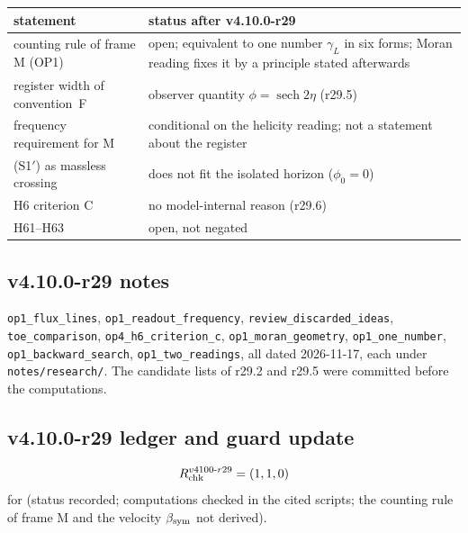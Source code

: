 \begin{center}
\small
\begin{tabular}{@{}>{\raggedright\arraybackslash}p{}>{\raggedright\arraybackslash}p{}@{}}
\toprule
statement & status after v4.10.0-r29\\
\midrule
counting rule of frame M (OP1) & open; equivalent to one number \(\gamma_L\) in six forms; Moran reading fixes it by a principle stated afterwards\\
register width of convention~F & observer quantity \(\phi=\operatorname{sech}2\eta\) (r29.5)\\
frequency requirement for M & conditional on the helicity reading; not a statement about the register\\
(S1\('\)) as massless crossing & does not fit the isolated horizon (\(\phi_0=0\))\\
H6 criterion C & no model-internal reason (r29.6)\\
H61--H63 & open, not negated\\
\bottomrule
\end{tabular}
\end{center}

\subsection*{v4.10.0-r29 notes}
\label{subsec:v4100-r29-notes}

\texttt{op1\_\allowbreak flux\_\allowbreak lines}, \texttt{op1\_\allowbreak readout\_\allowbreak frequency}, \texttt{review\_\allowbreak discarded\_\allowbreak ideas},
\texttt{toe\_\allowbreak comparison}, \texttt{op4\_\allowbreak h6\_\allowbreak criterion\_\allowbreak c}, \texttt{op1\_\allowbreak moran\_\allowbreak geometry},
\texttt{op1\_\allowbreak one\_\allowbreak number}, \texttt{op1\_\allowbreak backward\_\allowbreak search}, \texttt{op1\_\allowbreak two\_\allowbreak readings}, all dated
2026-11-17, each under \texttt{notes/\allowbreak research/}.  The candidate lists of r29.2 and r29.5 were committed before the computations.

\subsection*{v4.10.0-r29 ledger and guard update}
\label{subsec:v4100-r29-ledger-guard}

\[
R_{\rm chk}^{v4100\text{-}r29}=(1,1,0)
\]
for (status recorded; computations checked in the cited scripts; the counting rule of frame M and the velocity \(\beta_{\rm sym}\) not derived).


